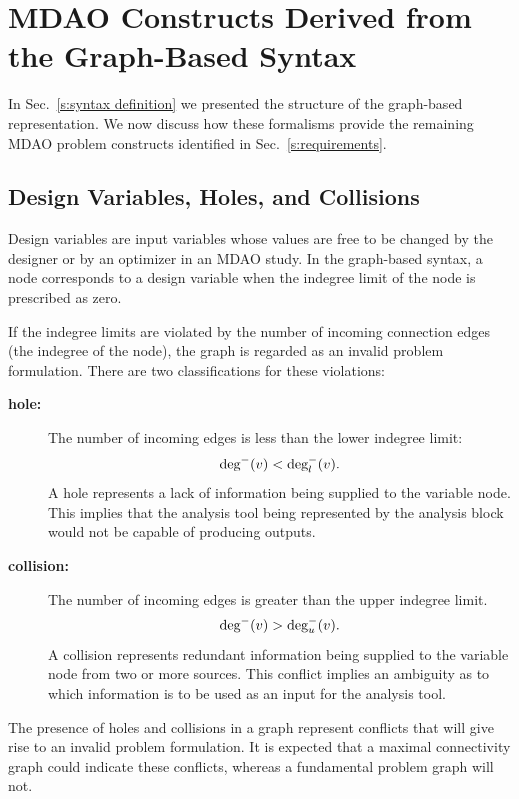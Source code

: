 \section{MDAO Constructs Derived from the Graph-Based Syntax}
  \label{s:graph representation}
  In Sec.~\ref{s:syntax definition} we presented the structure of the graph-based representation. We now discuss how these formalisms provide the remaining MDAO problem constructs identified in Sec.~\ref{s:requirements}.

\subsection{Design Variables, Holes, and Collisions}
  Design variables are input variables whose values are free to be 
  changed by the designer or by an optimizer in an MDAO study. In the graph-based 
  syntax, a node corresponds to a design variable when the indegree limit of the node is prescribed as zero.

  If the indegree limits are violated by the number of incoming connection edges 
  (the indegree of the node), the graph is regarded as an invalid problem formulation. There are two classifications for these violations:
    \begin{description}
      \item[\bf{hole:}] The number of incoming edges is less than the lower indegree limit:
        \begin{equation} 
      \textrm{deg}^-(v) < \textrm{deg}_l^-(v). 
      \label{e:hole} 
      \end{equation}
            A hole represents a lack of information being supplied to the variable node. 
            This implies that the analysis tool being represented by the analysis block 
            would not be capable of producing outputs.
          \item[\bf{collision:}] The number of incoming edges is greater than the upper indegree limit. 
            \begin{equation} 
      \textrm{deg}^-(v) > \textrm{deg}_u^-(v). 
      \label{e:collision}
      \end{equation}A collision represents redundant information being supplied to 
      the variable node from two or more sources. This conflict implies an 
      ambiguity as to which information is to be used as an input for the analysis tool.
  \end{description} 

  The presence of holes and collisions in a graph represent conflicts that will give
  rise to an invalid problem formulation. It is expected that a maximal connectivity 
  graph could indicate these conflicts, whereas a fundamental problem graph will not.

